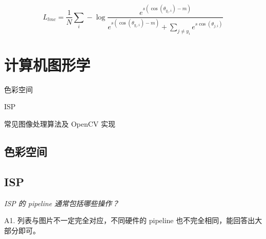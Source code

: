 \documentclass[cn,10pt,math=newtx,citestyle=gb7714-2015,bibstyle=gb7714-2015]{elegantbook}
\begin{document}
\begin{equation}
L_{l m c}=\frac{1}{N} \sum_{i}-\log \frac{e^{s\left(\cos \left(\theta_{y_{i}, i}\right)-m\right)}}{e^{s\left(\cos \left(\theta_{y_{i}, i}\right)-m\right)}+\sum_{j \neq y_{i}} e^{s \cos \left(\theta_{j, i}\right)}}
\end{equation}









\newpage


\section{计算机图形学}

\begin{introduction}
\item 色彩空间
\item ISP
\item 常见图像处理算法及 OpenCV 实现
\end{introduction}

\subsection{色彩空间}

\subsection{ISP}

\textit{ISP 的 pipeline 通常包括哪些操作？}

A1. 列表与图片不一定完全对应，不同硬件的 pipeline 也不完全相同，能回答出大部分即可。
\end{document}
